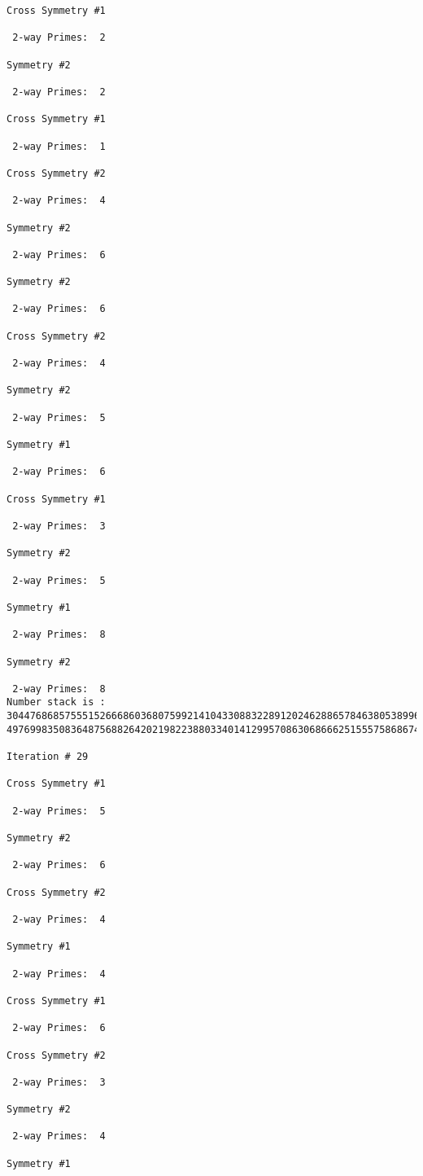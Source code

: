 \begin{verbatim}
Cross Symmetry #1

 2-way Primes: 	2

Symmetry #2

 2-way Primes: 	2

Cross Symmetry #1

 2-way Primes: 	1

Cross Symmetry #2

 2-way Primes: 	4

Symmetry #2

 2-way Primes: 	6

Symmetry #2

 2-way Primes: 	6

Cross Symmetry #2

 2-way Primes: 	4

Symmetry #2

 2-way Primes: 	5

Symmetry #1

 2-way Primes: 	6

Cross Symmetry #1

 2-way Primes: 	3

Symmetry #2

 2-way Primes: 	5

Symmetry #1

 2-way Primes: 	8

Symmetry #2

 2-way Primes: 	8
Number stack is :
30447686857555152666860368075992141043308832289120246288657846380538996794608835958544046240163340857
49769983508364875688264202198223880334014129957086306866625155575868674403758043361042640445859538806

Iteration #	29

Cross Symmetry #1

 2-way Primes: 	5

Symmetry #2

 2-way Primes: 	6

Cross Symmetry #2

 2-way Primes: 	4

Symmetry #1

 2-way Primes: 	4

Cross Symmetry #1

 2-way Primes: 	6

Cross Symmetry #2

 2-way Primes: 	3

Symmetry #2

 2-way Primes: 	4

Symmetry #1


\end{verbatim}

